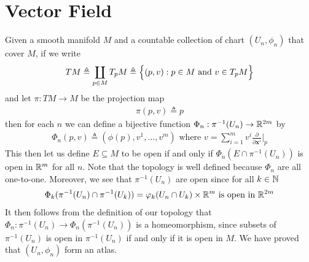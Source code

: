 \documentclass{report}
\begin{document}
\section{Vector Field}
\begin{abstract}

\end{abstract}
\begin{mdframed}
Given a smooth manifold $M$ and a countable collection of chart $(U_n, \phi_n) $ that cover $M$, if we write 
 \begin{align*}
TM\triangleq \coprod _{p \in M} T_pM\triangleq \Big\{ (p,v): p \in M\text{ and }v \in T_pM \Big\}
\end{align*}
and let $\pi:TM\rightarrow M$ be the projection map 
\begin{align*}
\pi (p,v)\triangleq p
\end{align*}
then for each $n$ we can define a bijective function  $\Phi_n:\pi^{-1}(U_n)\rightarrow \mathbb{R}^{2m}$ by 
\begin{align}
\label{tch}
  \Phi_n (p,v)\triangleq  (\phi (p), v^1,\dots ,v^m)\text{ where }v=\sum_{i=1}^m v^i \frac{\partial }{\partial \textbf{x}^i}\Big|_p
\end{align}
This then let us define $E\subseteq M$ to be open if and only if $\Phi_n (E\cap \pi^{-1}(U_n))$ is open in $\mathbb{R}^m$ for all  $n$. Note that  the topology is well defined because $\Phi_n$ are all one-to-one. Moreover, we see that $\pi^{-1}(U_n)$ are open since for all $k\in\mathbb{N}$
\begin{align*}
\Phi_k (\pi^{-1}(U_n)\cap \pi^{-1}(U_k))= \varphi_k(U_n \cap U_k)\times \mathbb{R}^m\text{ is open in }\mathbb{R}^{2m}
\end{align*}
It then follows from the definition of our topology that $\Phi_n:\pi^{-1}(U_n)\rightarrow \Phi_n(\pi^{-1}(U_n))$ is a homeomorphism, since subsets of $\pi^{-1}(U_n)$ is open in $\pi^{-1}(U_n)$ if and only if it is open in $M$. We have proved that $(U_n,\phi_n)$ form an atlas. \\


\end{mdframed}
\end{document}

